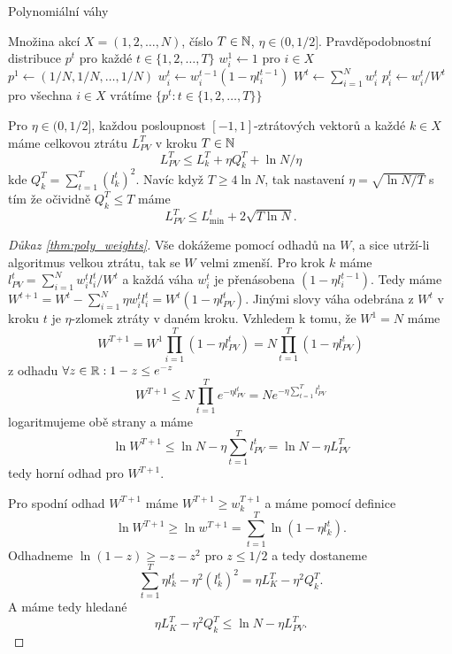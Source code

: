 
\begin{algorithm}
    \algrenewcommand{}
    \algrenewcommand{}
    \caption{Polynomiální váhy}
    \label{alg:poly_weights}
    \begin{algorithmic}[1]
        \Require  Množina akcí $X =(1,2,\dots,N)$, číslo $T \in \mathbb{N}$, $\eta \in (0,1/2]$.  
        \Ensure Pravděpodobnostní distribuce $p^t$ pro každé $t \in \{1,2,\dots, T\}$
        \State $w^1_i \leftarrow 1$ pro $i \in X$
        \State $p^1 \leftarrow (1/N,1/N,\dots,1/N)$
            \State $w^t_i \leftarrow w^{t-1}_i (1-\eta l^{t-1}_i)$
            \State $W^t \leftarrow \sum^N_{i=1} w^t_i$
            \State $p^t_i \leftarrow w^t_i/W^t$ pro všechna $i \in X$ 
        \EndFor
        \State vrátíme $\{p^t: t\in \{1,2,\dots,T\}\}$
    \end{algorithmic}
\end{algorithm}

\begin{theorem}
\label{thm:poly_weights}
Pro $\eta \in (0,1/2]$, každou posloupnost $[-1,1]$-ztrátových vektorů a každé $k \in X$ máme celkovou ztrátu $L^T_{PV}$ v kroku $T \in \mathbb{N}$ 
\[
    L^T_{PV} \leq L^T_{k} + \eta Q^T_k + \ln N / \eta
\]
kde $Q^T_k = \sum^T_{t =1 } (l^t_k)^2$. 
Navíc když $T \geq 4\ln N$, tak nastavení $\eta = \sqrt{\ln N/T}$ s tím že očividně $Q^T_k \leq T$ máme 
\[
    L^T_{PV} \leq L^t_{\min} + 2\sqrt{T \ln N}. 
\]
\end{theorem}

\begin{proof}[Důkaz \ref{thm:poly_weights}]
   Vše dokážeme pomocí odhadů na $W$, a sice utrží-li algoritmus velkou ztrátu, tak se $W$ velmi zmenší. 
    Pro krok $k$ máme $l^t_{PV} = \sum^N_{i=1} w^t_i l^t_i /W^t$ a každá váha $w^t_i$ je přenásobena $(1-\eta l^{t-1}_i)$. 
    Tedy máme $W^{t+1} = W^t - \sum_{i=1}^N \eta w^t_i l^t_i = W^t(1-\eta l^t_{PV})$. 
    Jinými slovy váha odebrána z $W^t$ v kroku $t$ je $\eta$-zlomek ztráty v daném kroku. 
    Vzhledem k tomu, že $W^1 = N$ máme 
    $$ 
    W^{T+1} = W^1 \prod^T_{i=1}(1- \eta l^t_{PV}) = N \prod^T_{t=1}(1- \eta l^t_{PV})
    $$
    z odhadu $\forall z \in \mathbb{R}: 1-z \leq e^{-z}$
    \[
        W^{T+1} \leq N \prod^T_{t=1} e^{-\eta l^t_{PV}} = Ne^{-\eta \sum^T_{t=1} l^t_{PV}}
    \]
    logaritmujeme obě strany a máme 
    \[
        \ln W^{T+1} \leq \ln N - \eta \sum^T_{t=1} l^t_{PV} = \ln N - \eta L^T_{PV} 
    \]
    tedy horní odhad pro $W^{T+1}$.

    Pro spodní odhad $W^{T+1}$ máme $W^{T+1} \geq w_k^{T+1}$ a máme pomocí definice 
    \[
        \ln W^{T+1} \geq \ln w^{T+1} = \sum^{T}_{t=1} \ln(1-\eta l_k^t). 
    \]
    Odhadneme $\ln (1-z) \geq -z-z^2$ pro $z \leq 1/2$ a tedy dostaneme
    \[
        \sum^{T}_{t=1} \eta l^t_k - \eta^2 (l^t_k)^2 = \eta L^T_K - \eta^2 Q_k^T. 
    \]
    A máme tedy hledané
    $$
    \eta L^T_K - \eta^2 Q_k^T \leq \ln N - \eta L^T_{PV}. 
    $$
\end{proof}

